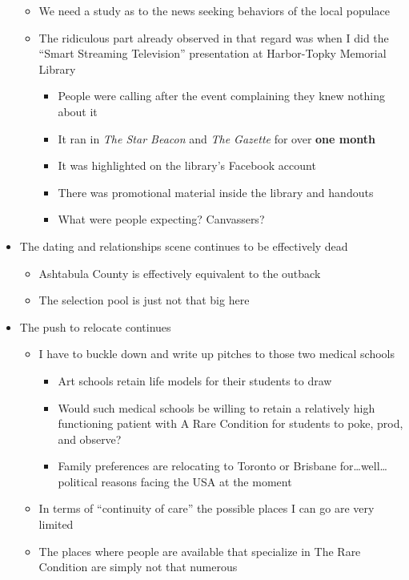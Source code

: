 \begin{itemize}
  \begin{itemize}
  \tightlist
  \item
    We need a study as to the news seeking behaviors of the local
    populace
  \item
    The ridiculous part already observed in that regard was when I did
    the ``Smart Streaming Television'' presentation at Harbor-Topky
    Memorial Library

    \begin{itemize}
    \tightlist
    \item
      People were calling after the event complaining they knew nothing
      about it
    \item
      It ran in \emph{The Star Beacon} and \emph{The Gazette} for over
      \textbf{one month}
    \item
      It was highlighted on the library's Facebook account
    \item
      There was promotional material inside the library and handouts
    \item
      What were people expecting? Canvassers?
    \end{itemize}
  \end{itemize}
\item
  The dating and relationships scene continues to be effectively dead

  \begin{itemize}
  \tightlist
  \item
    Ashtabula County is effectively equivalent to the outback
  \item
    The selection pool is just not that big here
  \end{itemize}
\item
  The push to relocate continues

  \begin{itemize}
  \tightlist
  \item
    I have to buckle down and write up pitches to those two medical
    schools

    \begin{itemize}
    \tightlist
    \item
      Art schools retain life models for their students to draw
    \item
      Would such medical schools be willing to retain a relatively high
      functioning patient with A Rare Condition for students to poke,
      prod, and observe?
    \item
      Family preferences are relocating to Toronto or Brisbane
      for\ldots well\ldots political reasons facing the USA at the
      moment
    \end{itemize}
  \item
    In terms of ``continuity of care'' the possible places I can go are
    very limited
  \item
    The places where people are available that specialize in The Rare
    Condition are simply not that numerous


\end{itemize}
\end{itemize}
